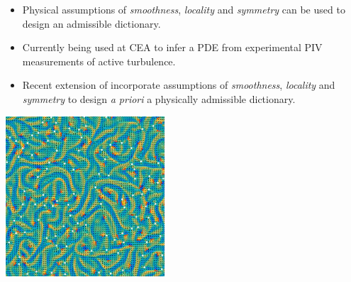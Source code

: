 \documentclass[aspectratio=169,compress,12pt]{beamer}
\begin{document}
\begin{frame}
    \vfill
    \begin{minipage}{.68\textwidth}
        \begin{itemize}
            \item Physical assumptions of \emph{smoothness}, \emph{locality} and \emph{symmetry} can be used to design an admissible dictionary.
            \par\bigskip
            \item Currently being used at CEA to infer a PDE from experimental PIV measurements of active turbulence.
            \par\bigskip
            \item Recent extension of incorporate assumptions of \emph{smoothness}, \emph{locality} and \emph{symmetry} to design \emph{a priori} a physically admissible dictionary.
        \end{itemize}
    \end{minipage}%
    \hfill
    \begin{minipage}{.28\textwidth}
        \centering
        \includegraphics[width=\textwidth]{imgs/active_turbulence.jpeg}
    \end{minipage}
    \vfill
\end{frame}
\end{document}
